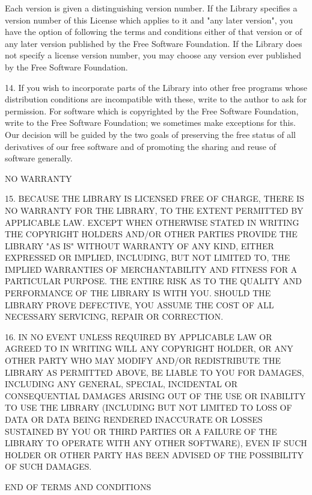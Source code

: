 Each version is given a distinguishing version number.  If the Library
specifies a version number of this License which applies to it and "any later
version", you have the option of following the terms and conditions either of
that version or of any later version published by the Free Software Foundation.
If the Library does not specify a license version number, you may choose any
version ever published by the Free Software Foundation.

14. If you wish to incorporate parts of the Library into other free programs
whose distribution conditions are incompatible with these, write to the
author to ask for permission.  For software which is copyrighted by the Free
Software Foundation, write to the Free Software Foundation; we sometimes make
exceptions for this.  Our decision will be guided by the two goals of
preserving the free status of all derivatives of our free software and of
promoting the sharing and reuse of software generally.

\begin{center}
{\sc NO WARRANTY}
\end{center}

15. BECAUSE THE LIBRARY IS LICENSED FREE OF CHARGE, THERE IS NO WARRANTY FOR
THE LIBRARY, TO THE EXTENT PERMITTED BY APPLICABLE LAW.  EXCEPT WHEN
OTHERWISE STATED IN WRITING THE COPYRIGHT HOLDERS AND/OR OTHER PARTIES
PROVIDE THE LIBRARY "AS IS" WITHOUT WARRANTY OF ANY KIND, EITHER EXPRESSED OR
IMPLIED, INCLUDING, BUT NOT LIMITED TO, THE IMPLIED WARRANTIES OF
MERCHANTABILITY AND FITNESS FOR A PARTICULAR PURPOSE.  THE ENTIRE RISK AS TO
THE QUALITY AND PERFORMANCE OF THE LIBRARY IS WITH YOU.  SHOULD THE LIBRARY
PROVE DEFECTIVE, YOU ASSUME THE COST OF ALL NECESSARY SERVICING, REPAIR OR
CORRECTION.

16. IN NO EVENT UNLESS REQUIRED BY APPLICABLE LAW OR AGREED TO IN WRITING
WILL ANY COPYRIGHT HOLDER, OR ANY OTHER PARTY WHO MAY MODIFY AND/OR
REDISTRIBUTE THE LIBRARY AS PERMITTED ABOVE, BE LIABLE TO YOU FOR DAMAGES,
INCLUDING ANY GENERAL, SPECIAL, INCIDENTAL OR CONSEQUENTIAL DAMAGES ARISING
OUT OF THE USE OR INABILITY TO USE THE LIBRARY (INCLUDING BUT NOT LIMITED TO
LOSS OF DATA OR DATA BEING RENDERED INACCURATE OR LOSSES SUSTAINED BY YOU OR
THIRD PARTIES OR A FAILURE OF THE LIBRARY TO OPERATE WITH ANY OTHER
SOFTWARE), EVEN IF SUCH HOLDER OR OTHER PARTY HAS BEEN ADVISED OF THE
POSSIBILITY OF SUCH DAMAGES.

\begin{center}
{\Large\sc END OF TERMS AND CONDITIONS}
\end{center}

